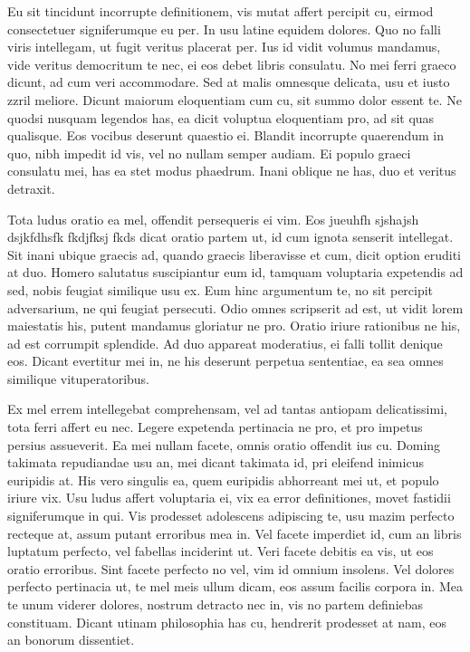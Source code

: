\documentclass{memoria}
\begin{document}
Eu sit tincidunt incorrupte definitionem, vis mutat affert percipit cu,
eirmod consectetuer signiferumque eu per. In usu latine equidem dolores. Quo no
falli viris intellegam, ut fugit veritus placerat per. Ius id vidit volumus
mandamus, vide veritus democritum te nec, ei eos debet libris consulatu. No mei
ferri graeco dicunt, ad cum veri accommodare. Sed at malis omnesque delicata,
usu et iusto zzril meliore. Dicunt maiorum eloquentiam cum cu, sit summo dolor
essent te. Ne quodsi nusquam legendos has, ea dicit voluptua eloquentiam pro, ad
sit quas qualisque. Eos vocibus deserunt quaestio ei. Blandit incorrupte
quaerendum in quo, nibh impedit id vis, vel no nullam semper audiam. Ei populo
graeci consulatu mei, has ea stet modus phaedrum. Inani oblique ne has, duo et
veritus detraxit. 



Tota ludus oratio ea mel, offendit persequeris ei vim. Eos jueuhfh sjshajsh dsjkfdhsfk fkdjfksj fkds
dicat oratio partem ut, id cum ignota senserit intellegat. Sit inani ubique
graecis ad, quando graecis liberavisse et cum, dicit option eruditi at duo.
Homero salutatus suscipiantur eum id, tamquam voluptaria expetendis ad sed,
nobis feugiat similique usu ex. Eum hinc argumentum te, no sit percipit
adversarium, ne qui feugiat persecuti. Odio omnes scripserit ad est, ut vidit
lorem maiestatis his, putent mandamus gloriatur ne pro. Oratio iriure rationibus
ne his, ad est corrumpit splendide. Ad duo appareat moderatius, ei falli tollit
denique eos. Dicant evertitur mei in, ne his deserunt perpetua sententiae, ea
sea omnes similique vituperatoribus. 



Ex mel errem intellegebat comprehensam, vel
ad tantas antiopam delicatissimi, tota ferri affert eu nec. Legere expetenda
pertinacia ne pro, et pro impetus persius assueverit. Ea mei nullam facete,
omnis oratio offendit ius cu. Doming takimata repudiandae usu an, mei dicant
takimata id, pri eleifend inimicus euripidis at. His vero singulis ea, quem
euripidis abhorreant mei ut, et populo iriure vix. Usu ludus affert voluptaria
ei, vix ea error definitiones, movet fastidii signiferumque in qui. Vis
prodesset adolescens adipiscing te, usu mazim perfecto recteque at, assum putant
erroribus mea in. Vel facete imperdiet id, cum an libris luptatum perfecto, vel
fabellas inciderint ut. Veri facete debitis ea vis, ut eos oratio erroribus.
Sint facete perfecto no vel, vim id omnium insolens. Vel dolores perfecto
pertinacia ut, te mel meis ullum dicam, eos assum facilis corpora in. Mea te
unum viderer dolores, nostrum detracto nec in, vis no partem definiebas
constituam. Dicant utinam philosophia has cu, hendrerit prodesset at nam, eos an
bonorum dissentiet.\\
\end{document}
